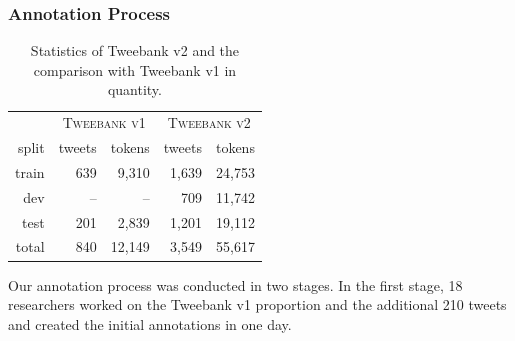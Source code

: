 \documentclass[11pt,a4paper]{article}
\newcommand{\yjcomment}[1]{\textcolor{orange}{[$_\mathrm{L}^\mathrm{Y}$#1]}}
\newcommand{\nss}[1]{\textcolor{magenta}{[$_\mathrm{S}^\mathrm{NS}$#1]}}
\begin{document}
\subsubsection{Annotation Process}
\begin{table}
	\centering
	\begin{tabular}{rrrrr}
		\hline
		 & \multicolumn{2}{c}{\textsc{Tweebank v1}} & \multicolumn{2}{c}{\textsc{Tweebank v2}} \\
		split & tweets & tokens & tweets & tokens \\
		\hline
		train & 639 & 9,310 & 1,639 & 24,753 \\
		dev & --\hphantom{0} & --\hphantom{00} & 709 & 11,742 \\
		test & 201 & 2,839 & 1,201 & 19,112 \\
		\hline
		total & 840 & 12,149 & 3,549 & 55,617 \\
		\hline
	\end{tabular}

\caption{Statistics of {\sc Tweebank v2} and the comparison with
{\sc Tweebank v1} in quantity.
\label{tbl:data-stat}
}
\end{table}
Our annotation process was conducted in two stages.
In the first stage, 18 researchers worked on the {\sc Tweebank v1}
proportion and the additional 210 tweets and created the initial annotations in one day.
\end{document}
